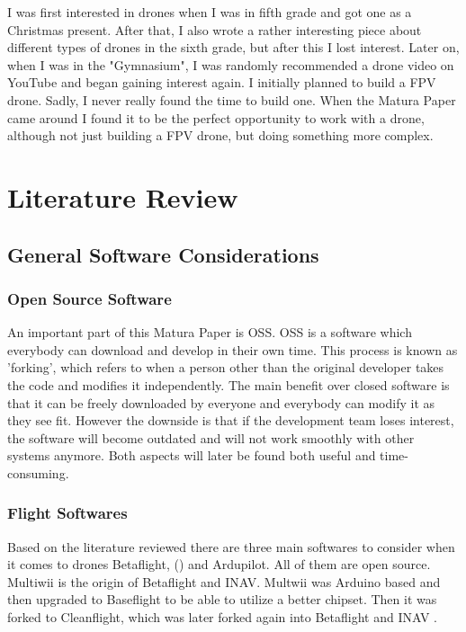 \documentclass[svgnames]{article}
\begin{document}
	I was first interested in drones when I was in fifth grade and got one as a Christmas present. After that, I also wrote a rather interesting piece about different types of drones in the sixth grade, but after this I lost interest. Later on, when I was in the "Gymnasium", I was randomly recommended a drone video on YouTube and began gaining interest again. I initially planned to build a \gls{FPV} drone. Sadly, I never really found the time to build one. When the Matura Paper came around I found it to be the perfect opportunity to work with a drone, although not just building a \gls{FPV} drone, but doing something more complex.


	\section{Literature Review}
	\subsection{General Software Considerations}

	\subsubsection{Open Source Software}
	An important part of this Matura Paper is \gls{OSS}. \gls{OSS} is a software which everybody can download and develop in their own time. This process is known as 'forking', which refers to when a person other than the original developer takes the code and modifies it independently. The main benefit over closed software is that it can be freely downloaded by everyone and everybody can modify it as they see fit. However the downside is that if the development team loses interest, the software will become outdated and will not work smoothly with other systems anymore. Both aspects will later be found both useful and time-consuming. 
	
	
	\subsubsection{Flight Softwares}
	Based on the literature reviewed there are three main softwares to consider when it comes to drones Betaflight, \myinav () and Ardupilot. All of them are open source. Multiwii is the origin of Betaflight and \gls{INAV}. Multwii was Arduino based and then upgraded to Baseflight to be able to utilize a better chipset. Then it was forked to Cleanflight, which was later forked again into Betaflight and \gls{INAV} \cite{history}. 
	
\end{document}
